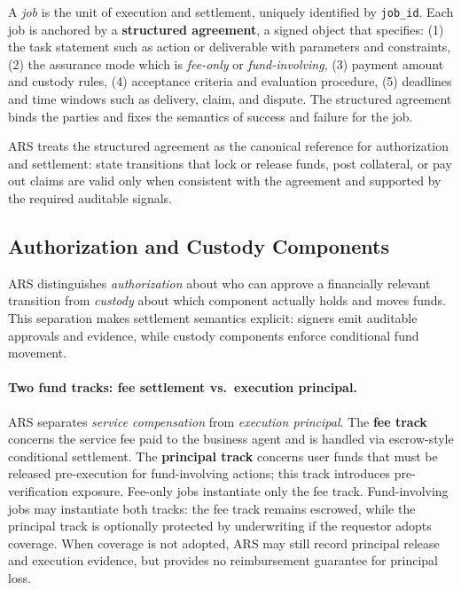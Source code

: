 \documentclass{article} %
\begin{document}
A \emph{job} is the unit of execution and settlement, uniquely identified by \texttt{job\_id}. Each job is anchored by a \textbf{structured agreement}, a signed object that specifies: (1) the task statement such as action or deliverable with parameters and constraints, (2) the assurance mode which is \emph{fee-only} or \emph{fund-involving}, (3) payment amount and custody rules, (4) acceptance criteria and evaluation procedure, (5) deadlines and time windows such as delivery, claim, and dispute. The structured agreement binds the parties and fixes the semantics of success and failure for the job.

\textsc{ARS} treats the structured agreement as the canonical reference for authorization and settlement: state transitions that lock or release funds, post collateral, or pay out claims are valid only when consistent with the agreement and supported by the required auditable signals. 


\subsection{Authorization and Custody Components}
\textsc{ARS} distinguishes \emph{authorization} about who can approve a financially relevant transition from \emph{custody} about which component actually holds and moves funds. This separation makes settlement semantics explicit: signers emit auditable approvals and evidence, while custody components enforce conditional fund movement.

\paragraph{Two fund tracks: fee settlement vs.\ execution principal.}
\textsc{ARS} separates \emph{service compensation} from \emph{execution principal}. The \textbf{fee track} concerns the service fee paid to the business agent and is handled via escrow-style conditional settlement. The \textbf{principal track} concerns user funds that must be released pre-execution for fund-involving actions; this track introduces pre-verification exposure. Fee-only jobs instantiate only the fee track. Fund-involving jobs may instantiate both tracks: the fee track remains escrowed, while the principal track is optionally protected by underwriting if the requestor adopts coverage. When coverage is not adopted, \textsc{ARS} may still record principal release and execution evidence, but provides no reimbursement guarantee for principal loss.
\end{document}
